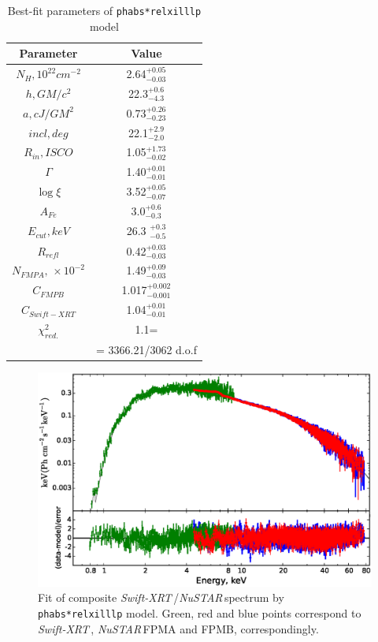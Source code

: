 \documentclass[a4paper,fleqn,usenatbib]{mnras}
\def\swiftx{{\em Swift-XRT\,}}
\def\nustar{{\em NuSTAR\,}}
\begin{document}
\begin{table}
\noindent
\centering
\caption{Best-fit parameters of \texttt{phabs*relxilllp} model}
\label{tab:fullfit}
\centering
\begin{tabular}{|c|c|}
\hline\hline
Parameter & Value \\
\hline
$N_{H}, 10^{22} cm^{-2}$ &   2.64$^{+0.05}_{-0.03}$ \\   
$h, GM/c^{2}$   &  22.3$^{+0.6}_{-4.3}$ \\
$a, cJ/GM^{2}$    & 0.73$^{+0.26}_{-0.23}$   \\
$incl, deg$ & 22.1$^{+2.9}_{-2.0}$ \\
$R_{in}, ISCO$  & 1.05$^{+1.73}_{-0.02}$ \\ 
$\Gamma$& 1.40$^{+0.01}_{-0.01}$   \\
$\log{\xi}$ &  3.52$^{+0.05}_{-0.07}$ \\
$A_{Fe}$   &  3.0$^{+0.6}_{-0.3}$  \\        
$E_{cut}, keV$    &       26.3 $^{+0.3}_{-0.5}$    \\
$R_{refl}$  &         0.42$^{+0.03}_{-0.03}$    \\
$N_{FMPA},\,\times10^{-2}$          &      1.49$^{+0.09}_{-0.03}$ \\
$C_{FMPB}$ & 1.017$^{+0.002}_{-0.001}$    \\
$C_{Swift-XRT}$    &   1.04$^{+0.01}_{-0.01}$\\
$\chi^{2}_{red.}$    &   1.1=\\ 
              &= 3366.21/3062 d.o.f\\
              
\hline
\end{tabular}
\end{table}




\begin{figure}
\centerline{\includegraphics[width=\linewidth]{spectrumfit_v02.eps}}
\caption{Fit of composite \swiftx/\nustar spectrum by \texttt{phabs*relxilllp} model. Green, red and blue points correspond to \swiftx, \nustar FPMA and FPMB, correspondingly.} 
\label{fig:spec}
\end{figure}  
\end{document}
